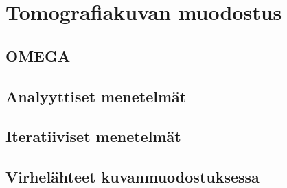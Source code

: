 \section{Tomografiakuvan muodostus}
\subsection{OMEGA}
\subsection{Analyyttiset menetelmät}
\subsection{Iteratiiviset menetelmät}
\subsection{Virhelähteet kuvanmuodostuksessa}